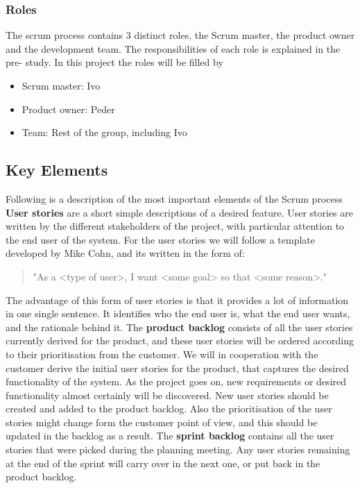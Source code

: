 \subsubsection{Roles}
The scrum process contains 3 distinct roles, the Scrum master, the product owner and the development team. The responsibilities of each role is explained in the pre- study. In this project the roles will be filled by
\begin{itemize}
\item Scrum master: Ivo
\item Product owner: Peder
\item Team: Rest of the group, including Ivo
\end{itemize}

\subsection{Key Elements}
Following is a description of the most important elements of the Scrum process
\newline
\newline
{\bf User stories} are a short simple descriptions of a desired feature. User stories are written by the different stakeholders of the project, with particular attention to the end user of the system. For the user stories we will follow a template developed by Mike Cohn, and its written in the form of: \begin{quote} "As a <type of user>, I want <some goal> so that <some reason>." \end{quote} The advantage of this form of user stories is that it provides a lot of information in one single sentence. It identifies who the end user is, what the end user wants, and the rationale behind it. 
\newline
\newline
The {\bf product backlog} consists of all the user stories currently derived for the product, and these user stories will be ordered according to their prioritisation from the customer. We will in cooperation with the customer derive the initial user stories for the product, that captures the desired functionality of the system. As the project goes on, new requirements or desired functionality almost certainly will be discovered. New user stories should be created and added to the product backlog. Also the prioritisation of the user stories might change form the customer point of view, and this should be updated in the backlog as a result. The {\bf sprint backlog} contains all the user stories that were picked during the planning meeting. Any user stories remaining at the end of the sprint will carry over in the next one, or put back in the product backlog.

